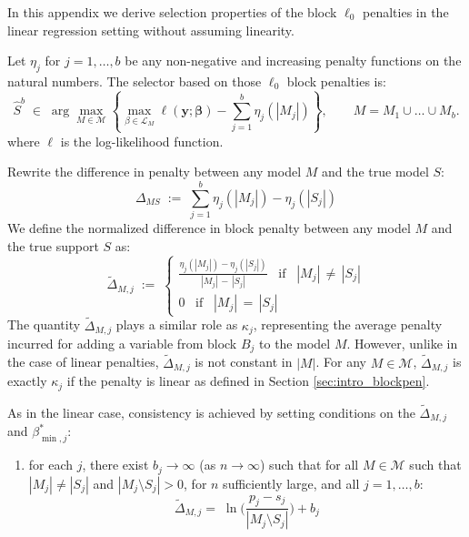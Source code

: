\documentclass[aos]{imsart}
\theoremstyle{plain}
\newcommand{\bs}{\boldsymbol}
\begin{document}
\begin{supplement}
\label{sec:appendixnonlinear}

In this appendix we derive selection properties of the block $\ell_0$ penalties in the linear regression setting without assuming linearity. 

Let $\eta_j$ for $j=1,\ldots,b$ be any non-negative and increasing penalty functions on the natural numbers. The selector based on those $\ell_0$ block penalties is:
\begin{equation}
  \widehat S^b\;\in\;\arg\max_{M\in \mathcal{M}} \left\{\max_{\beta\in \mathcal{L}_M} \ell(\bs y;\bs \beta)-\sum_{j=1}^b\eta_j (|M_j|)\right\},\qquad M=M_1\cup \ldots\cup M_b.	
\end{equation}
where $\ell$ is the log-likelihood function.

Rewrite the difference in penalty between any model $M$ and the true model $S$:
\begin{equation}\label{eq:DeltaMbis}
\Delta_{MS} \; := \; \sum_{j=1}^b \eta_j(|M_j|)-\eta_j(|S_j|)
\end{equation}
We define the normalized difference in block penalty between any model $M$ and the true support $S$ as:
 $$\tilde{\Delta}_{M, j}\; := \; \begin{cases}
     \frac{\eta_j(|M_j|)-\eta_j(|S_j|)}{|M_j|\,-\,|S_j|} \;\;\; \text{if}\;\;\; |M_j|\,\neq\,|S_j| \\
     0 \;\;\;\text{if}\;\;\; |M_j|\,=\,|S_j|
 \end{cases}  $$
The quantity $\tilde{\Delta}_{M, j}$ plays a similar role as $\kappa_j$, representing the average penalty incurred for adding a variable from block $B_j$ to the model $M$. However, unlike in the case of linear penalties,  $\tilde{\Delta}_{M, j}$ is not constant in $|M|$. For any $M\in\mathcal{M}$, $\tilde{\Delta}_{M, j}$ is exactly $\kappa_j$ if the penalty is linear as defined in Section \ref{sec:intro_blockpen}.

As in the linear case, consistency is achieved by setting conditions on the $\tilde{\Delta}_{M, j}$ and $\beta^*_{\min, j}$:
\begin{enumerate}[start=9,label={(A\arabic*)}]
    \item for each $j$, there exist $b_{j}\to \infty$ (as $n\to \infty$) such that for all $M \in \mathcal{M}$ such that $|M_j| \neq |S_j|$ and $|M_j \setminus S_j| >0$, for $n$ sufficiently large, and  all $j=1,\ldots,b$:
\begin{equation}\label{cond:suffIregnonlinpen}
    \tilde{\Delta}_{M, j} =\;\ln\bigg(\frac{p_j-s_j}{|M_j \setminus S_j| }\bigg) + b_{j}
\end{equation}


\end{enumerate}
\end{supplement}
\end{document}
